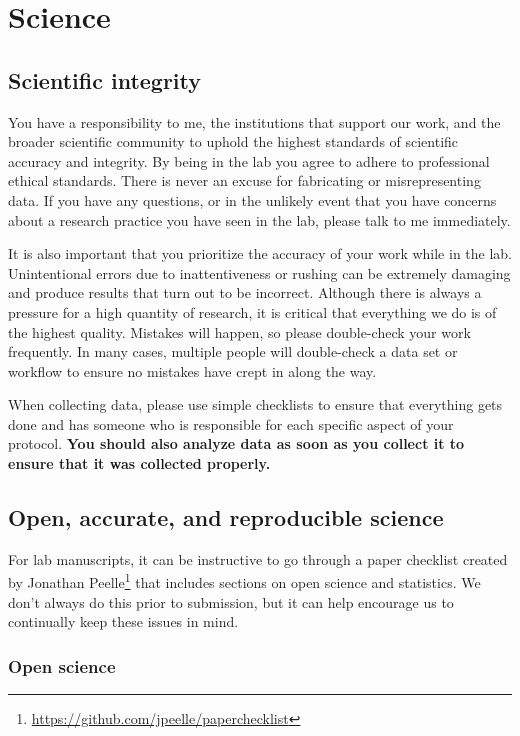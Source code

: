 \documentclass[letterpaper,11pt,oneside]{memoir}
\begin{document}
\chapter{Science}

\section{Scientific integrity}

You have a responsibility to me, the institutions that support our work, and the broader scientific community to uphold the highest standards of scientific accuracy and integrity. By being in the lab you agree to adhere to professional ethical standards. There is never an excuse for fabricating or misrepresenting data. If you have any questions, or in the unlikely event that you have concerns about a research practice you have seen in the lab, please talk to me immediately.

It is also important that you prioritize the accuracy of your work while in the lab. Unintentional errors due to inattentiveness or rushing can be extremely damaging and produce results that turn out to be incorrect. Although there is always a pressure for a high quantity of research, it is critical that everything we do is of the highest quality. Mistakes will happen, so please double-check your work frequently. In many cases, multiple people will double-check a data set or workflow to ensure no mistakes have crept in along the way.

When collecting data, please use simple checklists to ensure that everything gets done and has someone who is responsible for each specific aspect of your protocol. \textbf{You should also analyze data as soon as you collect it to ensure that it was collected properly.}


\section{Open, accurate, and reproducible science}
\label{sec:openscience}

For lab manuscripts, it can be instructive to go through a paper checklist created by Jonathan Peelle\footnote{\url{https://github.com/jpeelle/paperchecklist}} that includes sections on open science and statistics. We don't always do this prior to submission, but it can help encourage us to continually keep these issues in mind.


\subsection{Open science}
\end{document}

